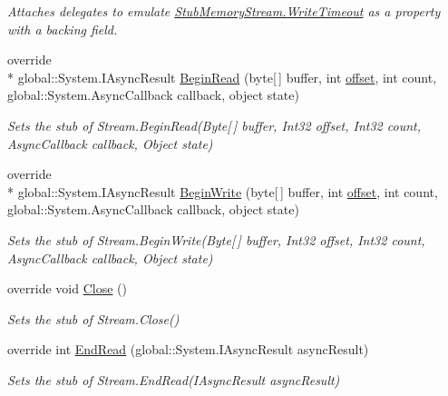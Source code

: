 \begin{DoxyCompactItemize}
\begin{DoxyCompactList}\small\item\em Attaches delegates to emulate \hyperlink{class_system_1_1_i_o_1_1_fakes_1_1_stub_memory_stream_ac808be851e7c46527d5abbff8281b86c}{Stub\-Memory\-Stream.\-Write\-Timeout} as a property with a backing field.\end{DoxyCompactList}\item 
override \\*
global\-::\-System.\-I\-Async\-Result \hyperlink{class_system_1_1_i_o_1_1_fakes_1_1_stub_memory_stream_a587c5a126347b94208a1cb7d808617c8}{Begin\-Read} (byte\mbox{[}$\,$\mbox{]} buffer, int \hyperlink{jquery-1_810_82_8js_a4a9f594d20d927164551fc7fa4751a2f}{offset}, int count, global\-::\-System.\-Async\-Callback callback, object state)
\begin{DoxyCompactList}\small\item\em Sets the stub of Stream.\-Begin\-Read(\-Byte\mbox{[}$\,$\mbox{]} buffer, Int32 offset, Int32 count, Async\-Callback callback, Object state)\end{DoxyCompactList}\item 
override \\*
global\-::\-System.\-I\-Async\-Result \hyperlink{class_system_1_1_i_o_1_1_fakes_1_1_stub_memory_stream_a1667923fb3a4d0b5246d30ddcf5c0d14}{Begin\-Write} (byte\mbox{[}$\,$\mbox{]} buffer, int \hyperlink{jquery-1_810_82_8js_a4a9f594d20d927164551fc7fa4751a2f}{offset}, int count, global\-::\-System.\-Async\-Callback callback, object state)
\begin{DoxyCompactList}\small\item\em Sets the stub of Stream.\-Begin\-Write(\-Byte\mbox{[}$\,$\mbox{]} buffer, Int32 offset, Int32 count, Async\-Callback callback, Object state)\end{DoxyCompactList}\item 
override void \hyperlink{class_system_1_1_i_o_1_1_fakes_1_1_stub_memory_stream_a980727ba5eb442dfe9edf99509241fa1}{Close} ()
\begin{DoxyCompactList}\small\item\em Sets the stub of Stream.\-Close()\end{DoxyCompactList}\item 
override int \hyperlink{class_system_1_1_i_o_1_1_fakes_1_1_stub_memory_stream_a428ebc98475ab0f40ab8e37a39add4d7}{End\-Read} (global\-::\-System.\-I\-Async\-Result async\-Result)
\begin{DoxyCompactList}\small\item\em Sets the stub of Stream.\-End\-Read(\-I\-Async\-Result async\-Result)\end{DoxyCompactList}\item 

\end{DoxyCompactItemize}
